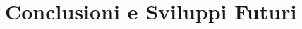 \chapter{Conclusioni e Sviluppi Futuri}
\label{capitolo7}
\thispagestyle{empty}

\begin{quotation}
{\footnotesize
\noindent\emph{}
\begin{flushright}
\end{flushright}
}
\end{quotation}
\vspace{0.5cm}
